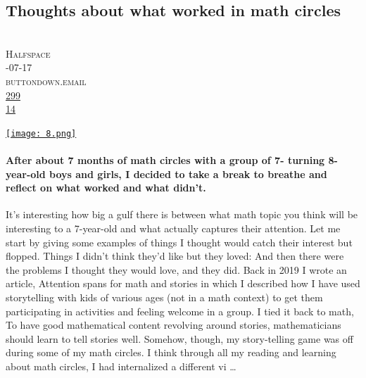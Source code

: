 \documentclass[10pt,a4paper]{article}
\begin{document}
\subsection{Thoughts about what worked in math circles}
\noindent\begin{minipage}[t]{0.19\linewidth}
\vspace{0pt}
\noindent\scshape\footnotesize
\\ {\scriptsize\faUser}\space 
Halfspace
\\ {\scriptsize\faCalendar}-07-17
\\ {\scriptsize\faGlobe}\space 
buttondown.email
\\ {\scriptsize\faThumbsOUp}\space 
\href{http://news.ycombinator.com/item?id=37276502\&utm\_term=comment}{299} 
\\ {\scriptsize\faComments}\space 
\href{http://news.ycombinator.com/item?id=37276502\&utm\_term=comment}{14} 
\end{minipage} 
\begin{minipage}[t]{0.80\linewidth}
\vspace{0pt}
\begin{multicols}{2}
    \href{https://buttondown.email/j2kun/archive/thoughts-about-what-worked-in-math-circles/?utm\_source=hackernewsletter\&utm\_medium=email\&utm\_term=fav}{
        \texttt{[image: 8.png]}
    }
\paragraph{After about 7 months of math circles with a group of 7- turning 8-year-old boys and girls, I decided to take a break to breathe and reflect on what worked and what didn't.}

It's interesting how big a gulf there is between what math topic you think will be interesting to a 7-year-old and what actually captures their attention. Let me start by giving some examples of things I thought would catch their interest but flopped.
Things I didn't think they'd like but they loved:
And then there were the problems I thought they would love, and they did.
Back in 2019 I wrote an article, Attention spans for math and stories in which I described how I have used storytelling with kids of various ages (not in a math context) to get them participating in activities and feeling welcome in a group. I tied it back to math,
To have good mathematical content revolving around stories, mathematicians should learn to tell stories well.
Somehow, though, my story-telling game was off during some of my math circles. I think through all my reading and learning about math circles, I had internalized a different vi
\dots
\end{multicols}
\end{minipage}
\par\medskip
\end{document}
